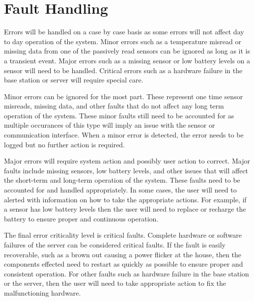 \documentclass{report}
\begin{document}
\section{Fault Handling}
Errors will be handled on a case by case basis as some errors will not affect
day to day operation of the system. Minor errors such as a temperature misread
or missing data from one of the passively read sensors can be ignored as long
as it is a transient event. Major errors such as a missing sensor or low
battery levels on a sensor will need to be handled. Critical errors such as a
hardware failure in the base station or server will require special care.

Minor errors can be ignored for the most part. These represent one time sensor
misreads, missing data, and other faults that do not affect any long term
operation of the system. These minor faults still need to be accounted for as
multiple occurances of this type will imply an issue with the sensor or
communication interface. When a minor error is detected, the error needs to be
logged but no further action is required.

Major errors will require system action and possibly user action to correct.
Major faults include missing sensors, low battery levels, and other issues that
will affect the short-term and long-term operation of the system. These faults
need to be accounted for and handled appropriately. In some cases, the user
will need to alerted with information on how to take the appropriate actions.
For example, if a sensor has low battery levels then the user will need to
replace or recharge the battery to ensure proper and continuous operation.

The final error criticality level is critical faults. Complete hardware or
software failures of the server can be considered critical faults. If the fault
is easily recoverable, such as a brown out causing a power flicker at the
house, then the components effected need to restart as quickly as possible to
ensure proper and consistent operation. For other faults such as hardware
failure in the base station or the server, then the user will need to take
appropriate action to fix the malfunctioning hardware.
\end{document}
